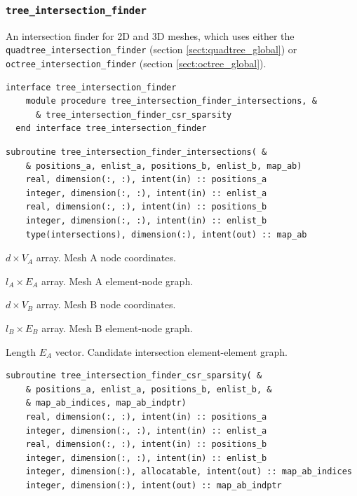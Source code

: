 \documentclass{article}
\begin{document}
\subsubsection{\texttt{tree\_intersection\_finder}}

An intersection finder for 2D and 3D meshes, which uses either the
\verb+quadtree_intersection_finder+ (section \ref{sect:quadtree_global}) or
\verb+octree_intersection_finder+ (section \ref{sect:octree_global}).

\begin{lstlisting}[language=FORTRAN]
  interface tree_intersection_finder
    module procedure tree_intersection_finder_intersections, &
      & tree_intersection_finder_csr_sparsity
  end interface tree_intersection_finder
\end{lstlisting}

\begin{lstlisting}[language=FORTRAN]
  subroutine tree_intersection_finder_intersections( &
    & positions_a, enlist_a, positions_b, enlist_b, map_ab)
    real, dimension(:, :), intent(in) :: positions_a
    integer, dimension(:, :), intent(in) :: enlist_a
    real, dimension(:, :), intent(in) :: positions_b
    integer, dimension(:, :), intent(in) :: enlist_b
    type(intersections), dimension(:), intent(out) :: map_ab
\end{lstlisting}

\begin{description}[font=\ttfamily\bfseries,leftmargin=2.2\parindent,labelindent=1.7\parindent,noitemsep]
  \item[positions\_a] $d \times V_A$ array. Mesh A node coordinates.
  \item[enlist\_a] $l_A \times E_A$ array. Mesh A element-node graph.
  \item[positions\_b] $d \times V_B$ array. Mesh B node coordinates.
  \item[enlist\_b] $l_B \times E_B$ array. Mesh B element-node graph.
  \item[map\_ab] Length $E_A$ vector. Candidate intersection element-element
    graph.
\end{description}

\begin{lstlisting}[language=FORTRAN]
  subroutine tree_intersection_finder_csr_sparsity( &
    & positions_a, enlist_a, positions_b, enlist_b, &
    & map_ab_indices, map_ab_indptr)
    real, dimension(:, :), intent(in) :: positions_a
    integer, dimension(:, :), intent(in) :: enlist_a
    real, dimension(:, :), intent(in) :: positions_b
    integer, dimension(:, :), intent(in) :: enlist_b
    integer, dimension(:), allocatable, intent(out) :: map_ab_indices
    integer, dimension(:), intent(out) :: map_ab_indptr
\end{lstlisting}
\end{document}
